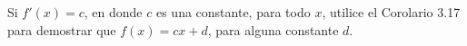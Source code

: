 \item Si $f'(x) = c$, en donde $c$ es una constante, para todo $x$, utilice el Corolario 3.17 para demostrar que $f(x) = cx + d$, para alguna constante $d$.
